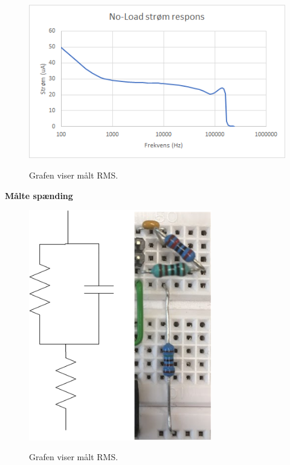 \begin{figure}[H]
\centering
{\includegraphics[width=\linewidth]
{Figure/testopstilling1fumlenoloadgraf}}
\caption{Grafen viser målt RMS.}
\label{analyse1}
\end{figure}

\textbf{Målte spænding}\\


\begin{figure}[H]
\centering
{\includegraphics[width=8cm]
{Figure/testopstilling1fumlevaevs}}
\caption{Grafen viser målt RMS.}
\label{analyse1}
\end{figure}


